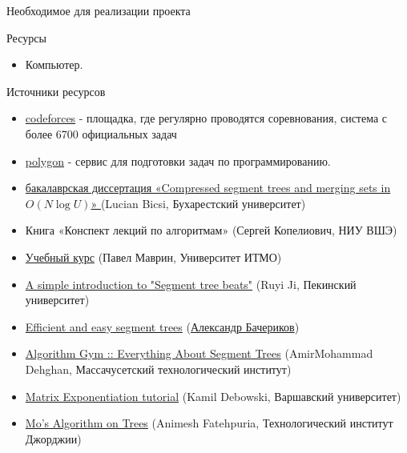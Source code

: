 \documentclass[8pt]{beamer}%
\begin{document}
	\begin{frame}{Необходимое для реализации проекта}
		\begin{block}{Ресурсы}
			\begin{itemize}
				\item Компьютер.
			\end{itemize}
		\end{block}
	
		\begin{block}{Источники ресурсов}
			\begin{itemize}
				
				\item \href{https://codeforces.com}{codeforces} - площадка, где регулярно проводятся соревнования, система с более 6700 официальных задач
				
				\item \href{https://polygon.codeforces.com}{polygon} - сервис для подготовки задач по программированию.
				
				\item \href{https://codeforces.com/blog/entry/83170}{бакалаврская диссертация «Compressed segment trees and merging sets in $O(N \log U)$» } (Lucian Bicsi, Бухарестский университет)
				
				
				\item Книга «Конспект лекций по алгоритмам» (Сергей Копелиович, НИУ ВШЭ)
				
				\item \href{https://codeforces.com/edu/course/2}{Учебный курс} (Павел Маврин, Университет ИТМО)
				\item \href{https://codeforces.com/blog/entry/57319}{A simple introduction to "Segment tree beats"} (Ruyi Ji, Пекинский университет)
				
				\item \href{https://codeforces.com/blog/entry/18051}{Efficient and easy segment trees} (\href{http://finals.snarknews.info/index.cgi?data=2011/teams/knu&class=final2011&year=2011}{Александр Бачериков})
				
				\item \href{https://codeforces.com/blog/entry/15890}{Algorithm Gym :: Everything About Segment Trees} (AmirMohammad Dehghan, Массачусетский технологический институт)
				
				\item \href{https://codeforces.com/blog/entry/80195}{Matrix Exponentiation tutorial} (Kamil Debowski, Варшавский университет)
				
				\item \href{https://codeforces.com/blog/entry/43230}{Mo's Algorithm on Trees} (Animesh Fatehpuria, Технологический институт Джорджии)
				

\end{itemize}
\end{block}
\end{frame}
\end{document}

